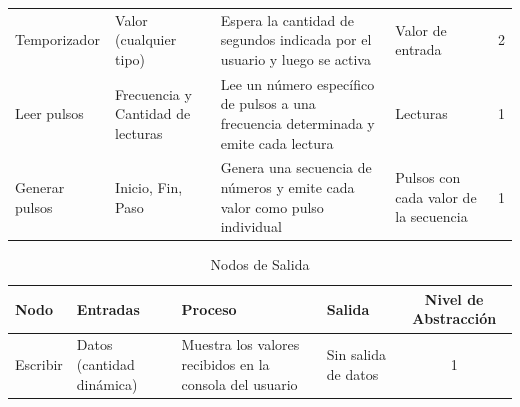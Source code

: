 \begin{table}[H]
\begin{tabularx}{\textwidth}{ l X X X c }
        Temporizador     & Valor (cualquier tipo)            & Espera la cantidad de segundos indicada por el usuario y luego se activa             & Valor de entrada                                    & 2                             \\
        Leer pulsos      & Frecuencia y Cantidad de lecturas & Lee un número específico de pulsos a una frecuencia determinada y emite cada lectura & Lecturas                                            & 1                             \\
        Generar pulsos   & Inicio, Fin, Paso                 & Genera una secuencia de números y emite cada valor como pulso individual             & Pulsos con cada valor de la secuencia               & 1                             \\
        \hline
    \end{tabularx}
\end{table}

\begin{table}[H]
    \centering
    \caption{Nodos de Salida}
    \begin{tabularx}{\textwidth}{ l X X X c }
        \hline
        \textbf{Nodo} & \textbf{Entradas}         & \textbf{Proceso}                                        & \textbf{Salida}     & \textbf{Nivel de Abstracción} \\ \hline
        Escribir      & Datos (cantidad dinámica) & Muestra los valores recibidos en la consola del usuario & Sin salida de datos & 1                             \\ \hline
    \end{tabularx}
\end{table}

